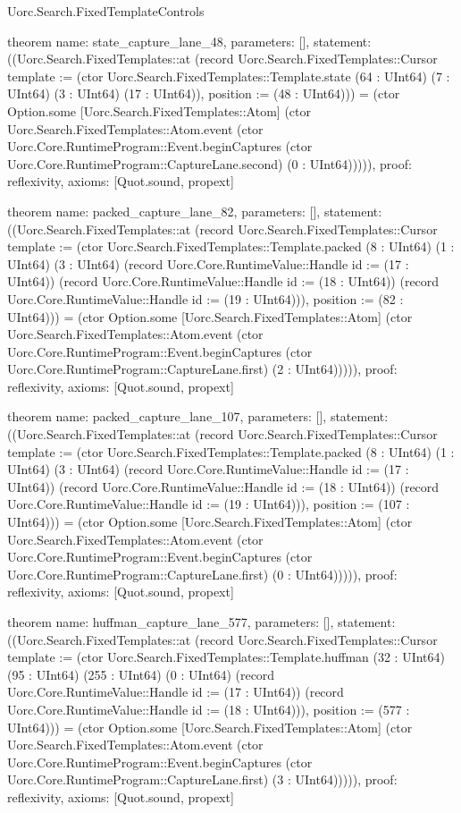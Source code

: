 \begin{lexlean}{Uorc.Search.FixedTemplateControls}
\begin{semanticmodule}
theorem{
  name: state_capture_lane_48,
  parameters: [],
  statement: ((Uorc.Search.FixedTemplates::at (record Uorc.Search.FixedTemplates::Cursor {template := (ctor Uorc.Search.FixedTemplates::Template.state (64 : UInt64) (7 : UInt64) (3 : UInt64) (17 : UInt64)), position := (48 : UInt64)})) = (ctor Option.some [Uorc.Search.FixedTemplates::Atom] (ctor Uorc.Search.FixedTemplates::Atom.event (ctor Uorc.Core.RuntimeProgram::Event.beginCaptures (ctor Uorc.Core.RuntimeProgram::CaptureLane.second) (0 : UInt64))))),
  proof: reflexivity{},
  axioms: [Quot.sound, propext]
}

theorem{
  name: packed_capture_lane_82,
  parameters: [],
  statement: ((Uorc.Search.FixedTemplates::at (record Uorc.Search.FixedTemplates::Cursor {template := (ctor Uorc.Search.FixedTemplates::Template.packed (8 : UInt64) (1 : UInt64) (3 : UInt64) (record Uorc.Core.RuntimeValue::Handle {id := (17 : UInt64)}) (record Uorc.Core.RuntimeValue::Handle {id := (18 : UInt64)}) (record Uorc.Core.RuntimeValue::Handle {id := (19 : UInt64)})), position := (82 : UInt64)})) = (ctor Option.some [Uorc.Search.FixedTemplates::Atom] (ctor Uorc.Search.FixedTemplates::Atom.event (ctor Uorc.Core.RuntimeProgram::Event.beginCaptures (ctor Uorc.Core.RuntimeProgram::CaptureLane.first) (2 : UInt64))))),
  proof: reflexivity{},
  axioms: [Quot.sound, propext]
}

theorem{
  name: packed_capture_lane_107,
  parameters: [],
  statement: ((Uorc.Search.FixedTemplates::at (record Uorc.Search.FixedTemplates::Cursor {template := (ctor Uorc.Search.FixedTemplates::Template.packed (8 : UInt64) (1 : UInt64) (3 : UInt64) (record Uorc.Core.RuntimeValue::Handle {id := (17 : UInt64)}) (record Uorc.Core.RuntimeValue::Handle {id := (18 : UInt64)}) (record Uorc.Core.RuntimeValue::Handle {id := (19 : UInt64)})), position := (107 : UInt64)})) = (ctor Option.some [Uorc.Search.FixedTemplates::Atom] (ctor Uorc.Search.FixedTemplates::Atom.event (ctor Uorc.Core.RuntimeProgram::Event.beginCaptures (ctor Uorc.Core.RuntimeProgram::CaptureLane.first) (0 : UInt64))))),
  proof: reflexivity{},
  axioms: [Quot.sound, propext]
}

theorem{
  name: huffman_capture_lane_577,
  parameters: [],
  statement: ((Uorc.Search.FixedTemplates::at (record Uorc.Search.FixedTemplates::Cursor {template := (ctor Uorc.Search.FixedTemplates::Template.huffman (32 : UInt64) (95 : UInt64) (255 : UInt64) (0 : UInt64) (record Uorc.Core.RuntimeValue::Handle {id := (17 : UInt64)}) (record Uorc.Core.RuntimeValue::Handle {id := (18 : UInt64)})), position := (577 : UInt64)})) = (ctor Option.some [Uorc.Search.FixedTemplates::Atom] (ctor Uorc.Search.FixedTemplates::Atom.event (ctor Uorc.Core.RuntimeProgram::Event.beginCaptures (ctor Uorc.Core.RuntimeProgram::CaptureLane.first) (3 : UInt64))))),
  proof: reflexivity{},
  axioms: [Quot.sound, propext]
}


\end{semanticmodule}
\end{lexlean}
